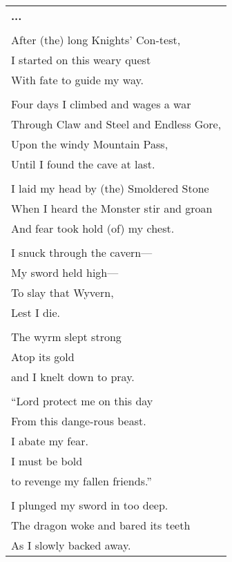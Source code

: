 \documentclass{article}
\begin{document}



\begin{center}
\begin{tabular}{l}
\textbf{...} \\
\\
After (the) long Knights' Con-test, \\
I started on this weary quest \\
With fate to guide my way. \\
\\
Four days I climbed and wages a war \\
Through Claw and Steel and Endless Gore, \\
Upon the windy Mountain Pass, \\
Until I found the cave at last. \\
\\
I laid my head by (the) Smoldered Stone \\
When I heard the Monster stir and groan \\
And fear took hold (of) my chest. \\
\\
I snuck through the cavern--- \\
My sword held high--- \\
To slay that Wyvern, \\
Lest I die. \\
\\
The wyrm slept strong \\
Atop its gold \\
and I knelt down to pray. \\
\\
``Lord protect me on this day \\
From this dange-rous beast. \\
I abate my fear. \\
I must be bold \\
to revenge my fallen friends.'' \\
\\
I plunged my sword in too deep. \\
The dragon woke and bared its teeth \\
As I slowly backed away. \\

\end{tabular}
\end{center}
\end{document}
